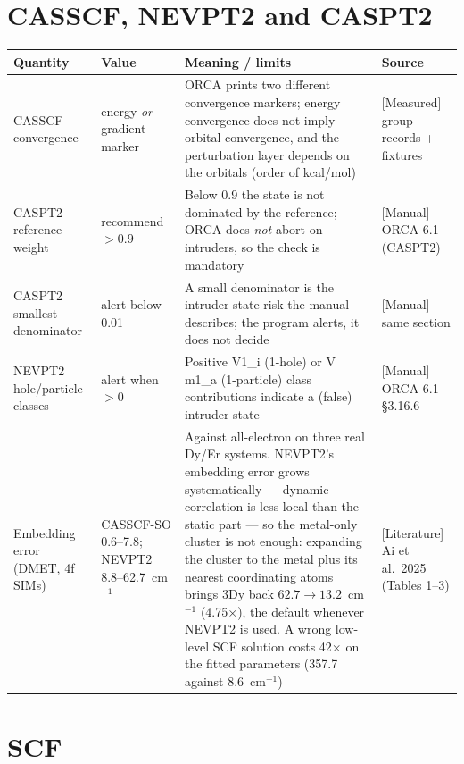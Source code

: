 \section{CASSCF, NEVPT2 and CASPT2}

\begin{center}
\begin{tabularx}{\textwidth}{@{}>{\raggedright\arraybackslash}p{3.2cm} >{\raggedright\arraybackslash}p{2.0cm} X >{\raggedright\arraybackslash}p{3.2cm}@{}}
\toprule
Quantity & Value & Meaning / limits & Source \\
\midrule
CASSCF convergence & energy \emph{or} gradient marker & ORCA prints two
  different convergence markers; energy convergence does not imply orbital
  convergence, and the perturbation layer depends on the orbitals (order of
  kcal/mol) & \textsf{[Measured]} group records + fixtures \\
CASPT2 reference weight & recommend $> 0.9$ & Below 0.9 the state is not
  dominated by the reference; ORCA does \emph{not} abort on intruders, so the
  check is mandatory & \textsf{[Manual]} ORCA 6.1 (CASPT2) \\
CASPT2 smallest denominator & alert below 0.01 & A small denominator is the
  intruder-state risk the manual describes; the program alerts, it does not
  decide & \textsf{[Manual]} same section \\
NEVPT2 hole/particle classes & alert when $> 0$ & Positive V1\_i (1-hole) or
  V m1\_a (1-particle) class contributions indicate a (false) intruder state &
  \textsf{[Manual]} ORCA 6.1 \S3.16.6 \\
Embedding error (DMET, 4f SIMs) & CASSCF-SO 0.6--7.8; NEVPT2 8.8--62.7~cm$^{-1}$
  & Against all-electron on three real Dy/Er systems. NEVPT2's embedding error
  grows systematically --- dynamic correlation is less local than the static
  part --- so the metal-only cluster is not enough: expanding the cluster to the
  metal plus its nearest coordinating atoms brings 3Dy back $62.7 \to
  13.2$~cm$^{-1}$ (4.75$\times$), the default whenever NEVPT2 is used. A wrong
  low-level SCF solution costs 42$\times$ on the fitted parameters (357.7
  against 8.6~cm$^{-1}$) & \textsf{[Literature]} Ai et al.\ 2025 (Tables 1--3) \\
\bottomrule
\end{tabularx}
\end{center}

\section{SCF}

